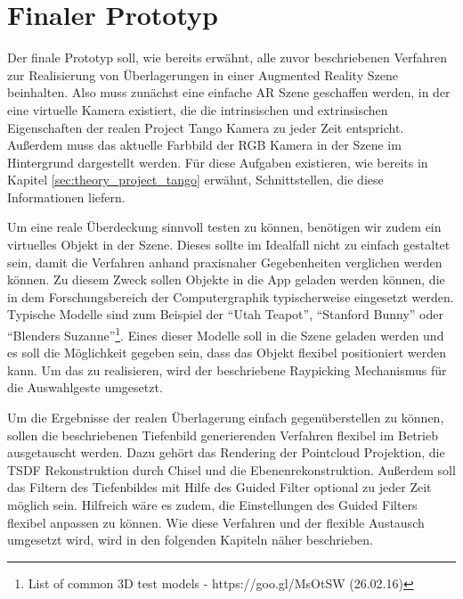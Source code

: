 \section{Finaler Prototyp} \label{sec:final_prototype}

Der finale Prototyp soll, wie bereits erwähnt, alle zuvor beschriebenen Verfahren zur Realisierung von Überlagerungen in einer Augmented Reality Szene beinhalten. Also muss zunächst eine einfache AR Szene geschaffen werden, in der eine virtuelle Kamera existiert, die die intrinsischen und extrinsischen Eigenschaften der realen Project Tango Kamera zu jeder Zeit entspricht. Außerdem muss das aktuelle Farbbild der RGB Kamera in der Szene im Hintergrund dargestellt werden. Für diese Aufgaben existieren, wie bereits in Kapitel \ref{sec:theory_project_tango} erwähnt, Schnittstellen, die diese Informationen liefern. 

Um eine reale Überdeckung sinnvoll testen zu können, benötigen wir zudem ein virtuelles Objekt in der Szene. Dieses sollte im Idealfall nicht zu einfach gestaltet sein, damit die Verfahren anhand praxisnaher Gegebenheiten verglichen werden können. Zu diesem Zweck sollen Objekte in die App geladen werden können, die in dem Forschungsbereich der Computergraphik typischerweise eingesetzt werden. Typische Modelle sind zum Beispiel der \enquote{Utah Teapot}, \enquote{Stanford Bunny} oder \enquote{Blenders Suzanne}\footnote{List of common 3D test models - https://goo.gl/MsOtSW (26.02.16)}.  Eines dieser Modelle soll in die Szene geladen werden und es soll die Möglichkeit gegeben sein, dass das Objekt flexibel positioniert werden kann. Um das zu realisieren, wird der beschriebene Raypicking Mechanismus für die Auswahlgeste umgesetzt.

Um die Ergebnisse der realen Überlagerung einfach gegenüberstellen zu können, sollen die beschriebenen Tiefenbild generierenden Verfahren flexibel im Betrieb ausgetauscht werden. Dazu gehört das Rendering der Pointcloud Projektion, die TSDF Rekonstruktion durch Chisel und die Ebenenrekonstruktion. Außerdem soll das Filtern des Tiefenbildes mit Hilfe des Guided Filter optional zu jeder Zeit möglich sein. Hilfreich wäre es zudem, die Einstellungen des Guided Filters flexibel anpassen zu können. Wie diese Verfahren und der flexible Austausch umgesetzt wird, wird in den folgenden Kapiteln näher beschrieben.